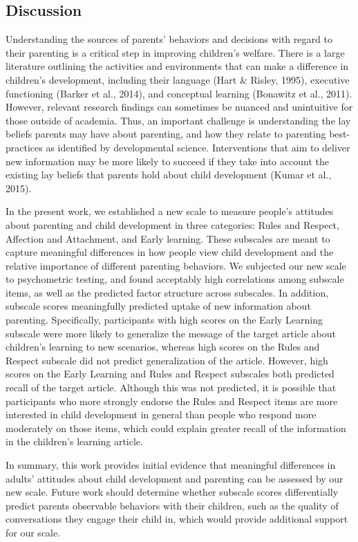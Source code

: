 \documentclass[10pt, letterpaper]{article}
\begin{document}
\subsection{Discussion}\label{discussion}

Understanding the sources of parents' behaviors and decisions with
regard to their parenting is a critical step in improving children's
welfare. There is a large literature outlining the activities and
environments that can make a difference in children's development,
including their language (Hart \& Risley, 1995), executive functioning
(Barker et al., 2014), and conceptual learning (Bonawitz et al., 2011).
However, relevant research findings can sometimes be nuanced and
unintuitive for those outside of academia. Thus, an important challenge
is understanding the lay beliefs parents may have about parenting, and
how they relate to parenting best-practices as identified by
developmental science. Interventions that aim to deliver new information
may be more likely to succeed if they take into account the existing lay
beliefs that parents hold about child development (Kumar et al., 2015).

In the present work, we established a new scale to measure people's
attitudes about parenting and child development in three categories:
Rules and Respect, Affection and Attachment, and Early learning. These
subscales are meant to capture meaningful differences in how people view
child development and the relative importance of different parenting
behaviors. We subjected our new scale to psychometric testing, and found
acceptably high correlations among subscale items, as well as the
predicted factor structure across subscales. In addition, subscale
scores meaningfully predicted uptake of new information about parenting.
Specifically, participants with high scores on the Early Learning
subscale were more likely to generalize the message of the target
article about children's learning to new scenarios, whereas high scores
on the Rules and Respect subscale did not predict generalization of the
article. However, high scores on the Early Learning and Rules and
Respect subscales both predicted recall of the target article. Although
this was not predicted, it is possible that participants who more
strongly endorse the Rules and Respect items are more interested in
child development in general than people who respond more moderately on
those items, which could explain greater recall of the information in
the children's learning article.

In summary, this work provides initial evidence that meaningful
differences in adults' attitudes about child development and parenting
can be assessed by our new scale. Future work should determine whether
subscale scores differentially predict parents observable behaviors with
their children, such as the quality of conversations they engage their
child in, which would provide additional support for our scale.
\end{document}
